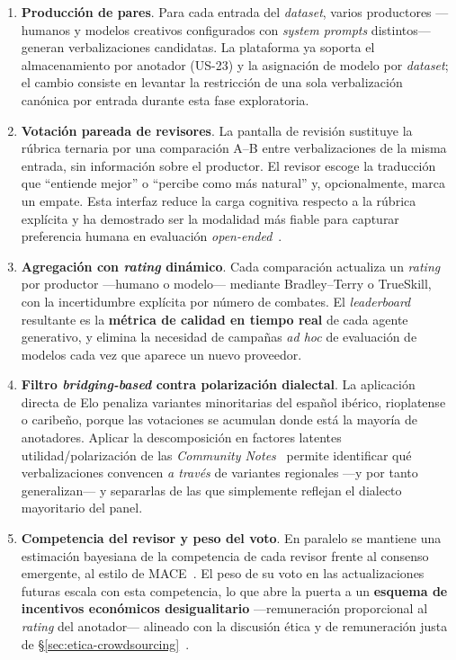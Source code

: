 \begin{enumerate}
	\item \textbf{Producción de pares}. Para cada entrada del
	      \textit{dataset}, varios productores ---humanos y modelos creativos
	      configurados con \emph{system prompts} distintos--- generan
	      verbalizaciones candidatas. La plataforma ya soporta el almacenamiento
	      por anotador (US-23) y la asignación de modelo por
	      \textit{dataset}; el cambio consiste en levantar la restricción de una
	      sola verbalización canónica por entrada durante esta fase
	      exploratoria.
	\item \textbf{Votación pareada de revisores}. La pantalla de revisión
	      sustituye la rúbrica ternaria por una comparación A--B entre
	      verbalizaciones de la misma entrada, sin información sobre el
	      productor. El revisor escoge la traducción que ``entiende mejor''
	      o ``percibe como más natural'' y, opcionalmente, marca un empate.
	      Esta interfaz reduce la carga cognitiva respecto a la rúbrica
	      explícita y ha demostrado ser la modalidad más fiable para
	      capturar preferencia humana en evaluación
	      \textit{open-ended}~\cite{Chiang2024_ChatbotArena}.
	\item \textbf{Agregación con \textit{rating} dinámico}. Cada
	      comparación actualiza un \textit{rating} por productor ---humano o
	      modelo--- mediante Bradley--Terry o TrueSkill, con la incertidumbre
	      explícita por número de combates. El \textit{leaderboard}
	      resultante es la \textbf{métrica de calidad en tiempo real} de
	      cada agente generativo, y elimina la necesidad de campañas
	      \textit{ad hoc} de evaluación de modelos cada vez que aparece un
	      nuevo proveedor.
	\item \textbf{Filtro \textit{bridging-based} contra polarización
		      dialectal}. La aplicación directa de Elo penaliza variantes
	      minoritarias del español ibérico, rioplatense o caribeño, porque
	      las votaciones se acumulan donde está la mayoría de anotadores.
	      Aplicar la descomposición en factores latentes utilidad/polarización de
	      las \textit{Community Notes}~\cite{Wojcik2022} permite identificar
	      qué verbalizaciones convencen \emph{a través} de variantes
	      regionales ---y por tanto generalizan--- y separarlas de las que
	      simplemente reflejan el dialecto mayoritario del panel.
	\item \textbf{Competencia del revisor y peso del voto}. En paralelo se
	      mantiene una estimación bayesiana de la competencia de cada
	      revisor frente al consenso emergente, al estilo de
	      MACE~\cite{Hovy2013_MACE}. El peso de su voto en las
	      actualizaciones futuras escala con esta competencia, lo que abre
	      la puerta a un \textbf{esquema de incentivos económicos
		      desigualitario} ---remuneración proporcional al \textit{rating} del
	      anotador--- alineado con la discusión ética y de remuneración
	      justa de
	      \S\ref{sec:etica-crowdsourcing}~\cite{Shmueli2021_BeyondFairPay,Whiting2019_FairWork}.
\end{enumerate}

